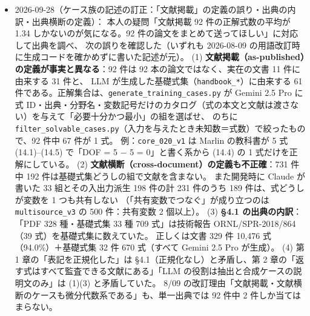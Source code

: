 \documentclass[11pt,a4paper]{jsarticle}
\begin{document}
\begin{itemize}[nosep]
    \textbf{前回の振り返り}：8/31 報告の計画 4 項目の状況を書き、LLM 等価判定の第 2 判定器の結果（608 組・一致率 88.0\%・$\kappa = 0.72$・厳しい判定で 0.254 $\to$ 0.198）を初めて報告した。
    BM25 と埋め込みベクトル検索の結果の報告は、先生の指示で保留し、実験設定の妥当性の確認を優先する。
    書誌は CrossRef で DOI・巻・号・頁を照合した（BM25 は原刊行の Vol.3(4) を維持）。
    \texttt{latexmk -gg} exit 0・5 ページ・未定義参照なし・はみ出しなし。配布用 PDF を更新し、Overleaf 用 zip \texttt{docs/seminar\_overleaf\_20260928.zip}（tex・bib・cls・latexmkrc）を新規作成、展開し直して単体で exit 0 を確認。
    修論第 2 章にも同じ問題（数学的に等価・記法と経験式・文脈で絞れる・シンボリック回帰の問題）が残るが、今回は報告書だけを直した。
  \item 2026-09-28（ケース族の記述の訂正：「文献掲載」の定義の誤り・出典の内訳・出典横断の定義）：
    本人の疑問「文献掲載 92 件の正解式数の平均が 1.34 しかないのが気になる。92 件の論文をまとめて送ってほしい」に対応して出典を調べ、
    次の誤りを確認した（いずれも 2026-08-09 の用語改訂時に生成コードを確かめずに書いた記述が元）。
    (1) \textbf{文献掲載（as-published）の定義が事実と異なる}：92 件は 92 本の論文ではなく、実在の文書 11 件に由来する 31 件と、
    LLM が生成した基礎式集（\texttt{handbook\_*}）に由来する 61 件である。正解集合は、\texttt{generate\_training\_cases.py} が
    Gemini 2.5 Pro に式 ID・出典・分野名・変数記号だけのカタログ（式の本文と文献は渡さない）を与えて「必要十分かつ最小」の組を選ばせ、
    のちに \texttt{filter\_solvable\_cases.py}（入力を与えたとき未知数＝式数）で絞ったもので、92 件中 67 件が 1 式。
    例：\texttt{core\_020\_v1} は Marlin の教科書が 5 式 (14.1)--(14.5) で「DOF = 5 $-$ 5 = 0」と書く系から (14.4) の 1 式だけを正解にしている。
    (2) \textbf{文献横断（cross-document）の定義も不正確}：731 件中 192 件は基礎式集どうしの組で文献を含まない。
    また開発時に Claude が書いた 33 組とその入出力派生 198 件の計 231 件のうち 189 件は、式どうしが変数を 1 つも共有しない
    （「共有変数でつなぐ」が成り立つのは \texttt{multisource\_v3} の 500 件：共有変数 2 個以上）。
    (3) \textbf{\S4.1 の出典の内訳}：「PDF 328 種・基礎式集 33 種 709 式」は技術報告 ORNL/SPR-2018/864（39 式）を基礎式集に数えていた。
    正しくは文書 329 件 10,476 式（94.0\%）＋基礎式集 32 件 670 式（すべて Gemini 2.5 Pro が生成）。
    (4) 第 1 章の「表記を正規化した」は \S4.1（正規化なし）と矛盾し、第 2 章の「返す式はすべて監査できる文献にある」「LLM の役割は抽出と合成ケースの説明文のみ」は (1)(3) と矛盾していた。
    8/09 の改訂理由「文献掲載・文献横断のケースも微分代数系である」も、単一出典では 92 件中 2 件しか当てはまらない。

\end{itemize}
\end{document}
